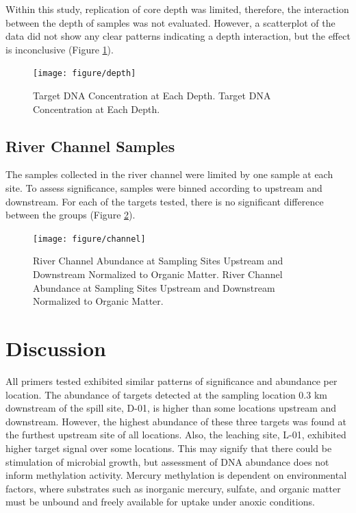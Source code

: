 \documentclass[ms, hidelinks]{uncgdissertationexp3}
\theoremstyle{plain}
\theoremstyle{definition}
\theoremstyle{remark}
\newcommand{\titlecaption}[2]{\caption[#1]{#1. #2}}
\begin{document}
Within this study, replication of core depth was limited, therefore, the interaction between the depth of samples was not evaluated. However, a scatterplot of the data did not show any clear patterns indicating a depth interaction, but the effect is inconclusive (Figure \ref{fig:depth}).

\begin{figure}[htbp]
\texttt{[image: figure/depth]}
   \titlecaption{Target DNA Concentration at Each Depth}{Target DNA Concentration at Each Depth.}
   \label{fig:depth}
   \end{figure}


\subsection{River Channel Samples}\label{river-channel-samples}

The samples collected in the river channel were limited by one sample at each site. To assess significance, samples were binned according to upstream and downstream. For each of the targets tested, there is no significant difference between the groups (Figure \ref{fig:channel}).

\begin{figure}[htbp]
  \texttt{[image: figure/channel]}
  \titlecaption{River Channel Abundance at Sampling Sites Upstream and Downstream Normalized to Organic Matter}{River Channel Abundance at Sampling Sites Upstream and Downstream Normalized to Organic Matter.}\label{fig:channel}
\end{figure}

\section{Discussion}\label{discussion}
All primers tested exhibited similar patterns of significance and abundance per location. The abundance of targets detected at the sampling location 0.3 km downstream of the spill site, D-01, is higher than some locations upstream and downstream. However, the highest abundance of these three targets was found at the furthest upstream site of all locations. Also, the leaching site, L-01, exhibited higher target signal over some locations. This may signify that there could be stimulation of microbial growth, but assessment of DNA abundance does not inform methylation activity. Mercury methylation is dependent on environmental factors, where substrates such as inorganic mercury, sulfate, and organic matter must be unbound and freely available for uptake under anoxic conditions.
\end{document}
